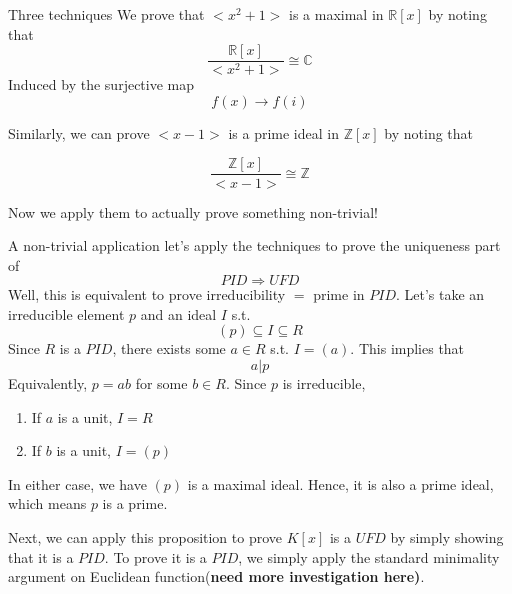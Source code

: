\documentclass[11pt]{article}
\begin{document}
\begin{mybox}{Three techniques }
We prove that $<x^2+1>$ is a maximal in $\mathbb{R}[x]$ by noting that 
$$
\frac{\mathbb{R}[x]}{<x^2+1>}\cong \mathbb{C}
$$
Induced by the surjective map 
$$
f(x)\rightarrow f(i)
$$

Similarly, we can prove  $<x-1>$ is a prime ideal in $\mathbb{Z}[x]$ by noting that 

$$
\frac{\mathbb{Z}[x]}{<x-1>}\cong \mathbb{Z}
$$


\end{mybox}
Now we apply them to actually prove something non-trivial! 

\begin{mybox}{A non-trivial application}
let's apply the techniques to prove the uniqueness part of 
$$
PID\Rightarrow UFD
$$
Well, this is equivalent to prove irreducibility $=$ prime in $PID$. Let's take an irreducible element $p$ and an ideal $I$ s.t. 
$$
(p)\subseteq I\subseteq R
$$
Since $R$ is a $PID$, there exists some $a\in R$ s.t.  $I=(a)$. This implies that 
$$
a|p
$$
Equivalently,  $p=ab$ for some $b\in R$.  Since $p$ is irreducible,

\begin{enumerate}
    \item If $a$ is a unit, $I=R$
    \item If $b$ is a unit, $I=(p)$
\end{enumerate}

In either case, we have $(p)$ is a maximal ideal. Hence, it is also a prime ideal, which means $p$ is a prime. \\
\end{mybox}

Next, we can apply this proposition to prove $K[x]$ is a $UFD$ by simply showing that it is a $PID$. To prove it is a $PID$, we simply apply the standard minimality argument on Euclidean function(\textbf{need more investigation here)}. \\
\end{document}
